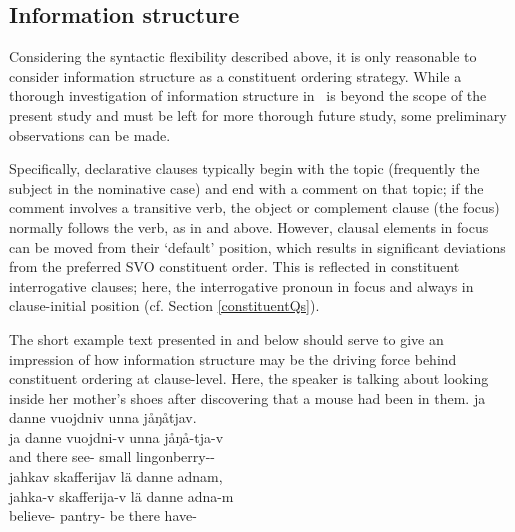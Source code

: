 \subsection{Information structure}\label{infoStructure}
Considering the syntactic flexibility described above, it is only reasonable to consider information structure as a constituent ordering strategy. 
While a thorough investigation of information structure in \PS\ is beyond the scope of the present study %
and must be left for more thorough future study, some preliminary observations can be made. %

Specifically, declarative clauses typically begin with the topic (frequently the subject in the nominative case) and end with a comment on that topic; if the comment involves a transitive verb, the object or complement clause (the focus) normally follows the verb, as in  and  above. However, clausal elements in focus can be moved from their ‘default’ position, which results in significant deviations from the %
preferred SVO constituent order. This is reflected in constituent interrogative clauses; here, the interrogative pronoun in focus and always in clause-initial position %
(cf. Section \ref{constituentQs}).

The short example text presented in  and  below should serve to give an impression of how information structure may be the driving force behind constituent ordering at clause-level. Here, the speaker is talking about looking inside her mother’s shoes after discovering that a mouse had been in them.
\ea\label{mouseText4}%
\glll	ja danne vuojdniv unna jåŋåtjav.\\
	ja danne vuojdni-v unna jåŋå-tja-v\\
	and there see- small lingonberry--\\\nopagebreak
{}	
\ex\label{mouseText5}%
\glll	jahkav skafferijav lä danne adnam,\\
	jahka-v skafferija-v lä danne adna-m\\
	believe- pantry- be\BS{} there have-\\\nopagebreak
{}	
\z

